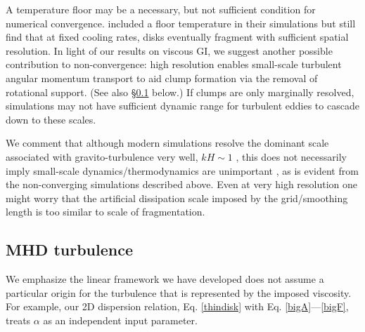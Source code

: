 %


A temperature floor may be a necessary, but not sufficient condition
for numerical convergence. \cite{baehr15} included a floor temperature 
in their simulations but still find that at fixed cooling rates, disks
eventually fragment with sufficient spatial resolution.
In light of our results on viscous GI, 
we suggest another possible contribution to non-convergence: %
high resolution enables small-scale turbulent angular momentum transport 
to aid clump formation via the removal of rotational support. (See also \S\ref{MHD} below.) 
If clumps are only marginally resolved, simulations may not have sufficient dynamic range for turbulent eddies
to cascade down to these scales.

We comment that although modern simulations resolve the dominant
scale associated with gravito-turbulence very well, $kH\sim 1$
\citep{cossins09}, this does not
necessarily imply small-scale dynamics/thermodynamics are unimportant 
\citep[especially for non-linear evolution, ][]{young15},  
as is evident from the non-converging simulations described above.   
Even at very high resolution one might worry that the artificial dissipation scale
imposed by the grid/smoothing length is too similar to scale of fragmentation.

\subsection{MHD turbulence}\label{MHD}%
We emphasize the linear framework we have developed does not assume  
a particular origin for the turbulence that is represented by the imposed
viscosity. For example, our 2D dispersion 
relation, Eq. \ref{thindisk} with Eq. \ref{bigA}---\ref{bigF}, treats 
$\alpha$ as an independent input parameter. 

